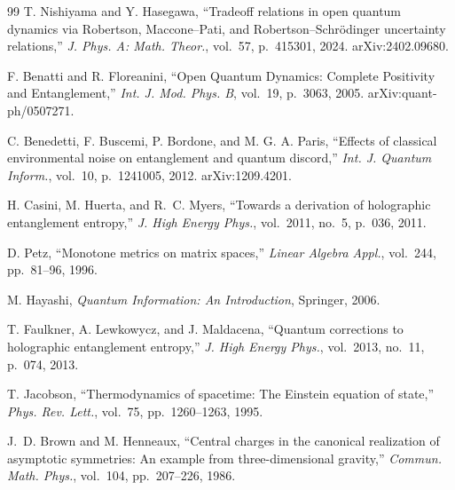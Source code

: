 \documentclass[10pt]{article}
\begin{document}
\begin{thebibliography}{99}
T. Nishiyama and Y. Hasegawa, 
“Tradeoff relations in open quantum dynamics via Robertson, Maccone–Pati, and Robertson–Schrödinger uncertainty relations,” 
\emph{J. Phys. A: Math. Theor.}, vol.~57, p.~415301, 2024. arXiv:2402.09680.

F. Benatti and R. Floreanini, 
“Open Quantum Dynamics: Complete Positivity and Entanglement,” 
\emph{Int. J. Mod. Phys. B}, vol.~19, p.~3063, 2005. arXiv:quant-ph/0507271.

C. Benedetti, F. Buscemi, P. Bordone, and M. G. A. Paris, 
“Effects of classical environmental noise on entanglement and quantum discord,” 
\emph{Int. J. Quantum Inform.}, vol.~10, p.~1241005, 2012. arXiv:1209.4201.

H. Casini, M. Huerta, and R.~C. Myers,
“Towards a derivation of holographic entanglement entropy,”
\emph{J. High Energy Phys.}, vol.~2011, no.~5, p.~036, 2011.

D. Petz,
“Monotone metrics on matrix spaces,”
\emph{Linear Algebra Appl.}, vol.~244, pp.~81–96, 1996.

M. Hayashi,
\emph{Quantum Information: An Introduction},
Springer, 2006.

T. Faulkner, A. Lewkowycz, and J. Maldacena,
“Quantum corrections to holographic entanglement entropy,”
\emph{J. High Energy Phys.}, vol.~2013, no.~11, p.~074, 2013.

T. Jacobson,
“Thermodynamics of spacetime: The Einstein equation of state,”
\emph{Phys. Rev. Lett.}, vol.~75, pp.~1260–1263, 1995.

J.~D. Brown and M. Henneaux,
“Central charges in the canonical realization of asymptotic symmetries: An example from three-dimensional gravity,”
\emph{Commun. Math. Phys.}, vol.~104, pp.~207–226, 1986.

\end{thebibliography}
\end{document}
